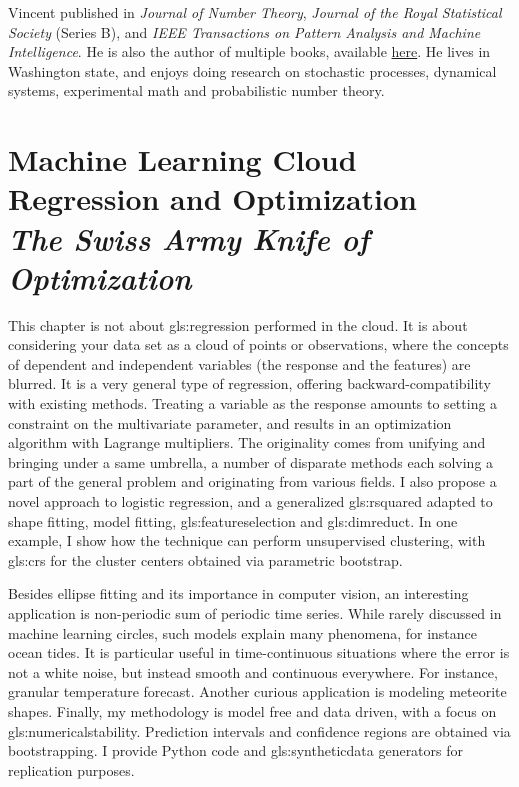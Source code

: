 \documentclass[oneside,10pt]{book}
\newcommand\Chapter[2]{
  \chapter[#1]{#1\\[2ex]\Large\itshape#2}
}
\begin{document}
Vincent published in {\em Journal of Number Theory}, {\em Journal of the Royal Statistical Society} (Series B), and {\em IEEE Transactions on Pattern Analysis and Machine Intelligence}. He is also the author of multiple books, available \href{https://mltechniques.com/resources/}{here}. He lives  in Washington state, and enjoys doing research on stochastic processes, dynamical systems, experimental math and probabilistic number theory.

\hypersetup{linkcolor=red}
\tableofcontents

\Chapter{Machine Learning Cloud Regression and Optimization}{The Swiss Army Knife of Optimization}

This chapter is not about \gls{gls:regression} performed in the cloud. It is about considering your data set as a cloud of points or observations, where the
 concepts of dependent and independent variables (the response and the features) are blurred. It is a very general type of regression, offering
 backward-compatibility with existing methods. Treating a variable as the response amounts to setting a constraint on the multivariate parameter, and results in an optimization algorithm with  Lagrange multipliers. The originality comes from unifying and bringing under a same umbrella, a number of disparate methods each solving a part of the general problem and originating from various fields. I also
 propose a novel approach to logistic regression, and a generalized \gls{gls:rsquared} adapted to shape fitting, model fitting, \gls{gls:featureselection}
and  \gls{gls:dimreduct}.  In one example, I show how the technique can perform unsupervised clustering, with \glspl{gls:cr} for
 the cluster centers obtained via parametric bootstrap.

Besides ellipse fitting and its importance in \textcolor{index}{computer vision}, an interesting application is non-periodic sum of periodic time series. While rarely discussed in machine learning circles, such models explain many phenomena, for instance ocean tides. It is particular useful in time-continuous situations where the error is not a white noise, but instead smooth and continuous everywhere. For instance, granular temperature forecast.  Another curious application is modeling meteorite shapes. Finally, my methodology is model free and data driven, with a focus on \gls{gls:numericalstability}. Prediction intervals and confidence regions
 are obtained via bootstrapping. I provide Python code and \gls{gls:syntheticdata} generators for replication purposes.
\end{document}
